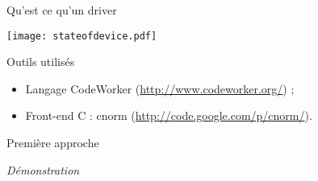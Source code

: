 \documentclass[xcolor={usenames,svgnames}]{beamer}
\begin{document}
\begin{frame}[fragile]{Qu'est ce qu'un driver}
\begin{center}
       \texttt{[image: stateofdevice.pdf]}
\end{center}
\end{frame}
%

\begin{frame}{Outils utilisés}
	\begin{center}
        \Large{%
	\begin{itemize}
		\item	Langage CodeWorker {\small (\url{http://www.codeworker.org/})} ;
		\item	Front-end C : cnorm {\small (\url{http://code.google.com/p/cnorm/})}.
	\end{itemize}
        }
	\end{center}
\end{frame}

\begin{frame}{Première approche}
	\begin{center}
	\Huge{\emph{Démonstration}}
	\end{center}
\end{frame}
\end{document}
